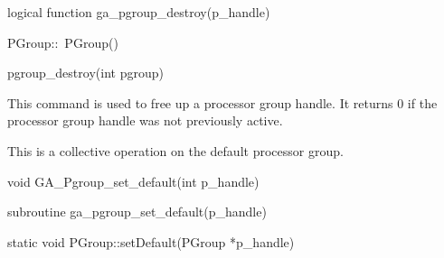 \documentclass[12pt]{article}
\begin{document}
\begin{fapi}
\begin{fcode}
logical function ga_pgroup_destroy(p_handle)
\end{fcode}
\begin{funcargs}
\end{funcargs}
\end{fapi}

\begin{cxxapi}
\begin{cxxcode}
PGroup::~PGroup()
\end{cxxcode}
\end{cxxapi}

\begin{pyapi}
\begin{pycode}
pgroup_destroy(int pgroup)
\end{pycode}
\end{pyapi}

\gcoll

\begin{desc}

  This command is used to free up a processor group handle. It returns
  0 if the processor group handle was not previously active.

  This is a collective operation on the default processor group.

\end{desc}


\begin{capi}
\begin{ccode}
void GA_Pgroup_set_default(int p_handle)
\end{ccode}
\begin{funcargs}
\end{funcargs}
\end{capi}

\begin{fapi}
\begin{fcode}
subroutine ga_pgroup_set_default(p_handle)
\end{fcode}
\begin{funcargs}
\end{funcargs}
\end{fapi}

\begin{cxxapi}
\begin{cxxcode}
static void PGroup::setDefault(PGroup *p_handle)
\end{cxxcode}
\begin{funcargs}
\end{funcargs}
\end{cxxapi}
\end{document}
